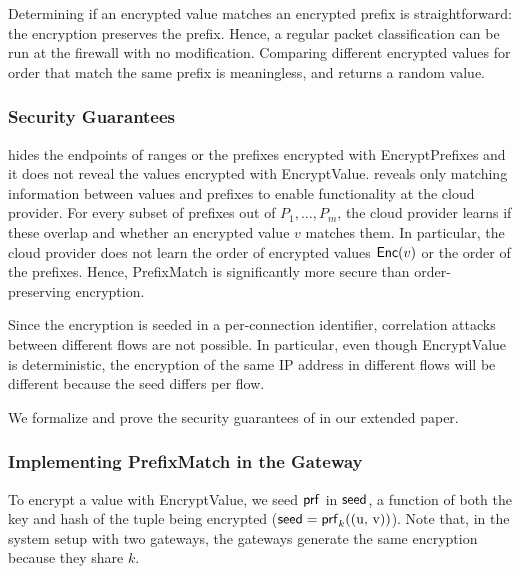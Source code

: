 
Determining if an encrypted value matches an encrypted prefix is straightforward: the encryption preserves the prefix.
Hence, a regular packet classification can be run at the firewall with no modification. Comparing different encrypted values for order that match the same prefix is meaningless, and returns a random value.




\subsubsection{Security Guarantees}

\pmatch{} hides the endpoints of ranges or the prefixes encrypted with EncryptPrefixes and it does not reveal the values encrypted with EncryptValue. \pmatch{} reveals only matching information between values and prefixes to enable functionality at the cloud provider.  For every subset of prefixes out of $P_1, \dots, P_m$, the cloud provider learns if these overlap and whether an encrypted value $v$ matches them. In particular, the cloud provider does not learn the order of encrypted values $\mathsf{Enc}(v)$ or the order of the prefixes. Hence, PrefixMatch is significantly more secure than order-preserving encryption.

%
Since the encryption is seeded in a per-connection identifier, correlation attacks between different flows are not possible. 
In particular, even though EncryptValue is deterministic, the encryption of the same IP address in different flows will be different because the seed differs per flow.

We formalize and prove the security guarantees of \pmatch{} in our extended paper. 

\subsubsection{Implementing PrefixMatch in the Gateway}
\label{sec:tree}



To encrypt a value with EncryptValue, we seed $\mathsf{prf}$ in $\mathsf{seed}$, a function of both the key and hash of the tuple being encrypted ($\mathsf{seed} = \mathsf{prf}_k(\text{(u, v)})$). Note that, in the system setup with two gateways, the gateways generate the same encryption because they share $k$.  


